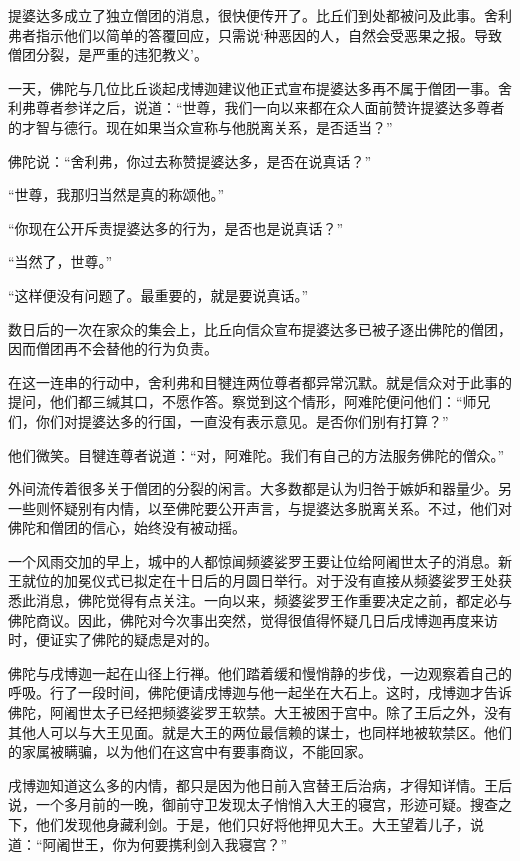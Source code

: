 \documentclass[12pt,twoside,openany]{book}
\begin{document}
提婆达多成立了独立僧团的消息，很快便传开了。比丘们到处都被问及此事。舍利弗者指示他们以简单的答覆回应，只需说‘种恶因的人，自然会受恶果之报。导致僧团分裂，是严重的违犯教义’。

一天，佛陀与几位比丘谈起戌博迦建议他正式宣布提婆达多再不属于僧团一事。舍利弗尊者参详之后，说道：“世尊，我们一向以来都在众人面前赞许提婆达多尊者的才智与德行。现在如果当众宣称与他脱离关系，是否适当？”

佛陀说：“舍利弗，你过去称赞提婆达多，是否在说真话？”

“世尊，我那归当然是真的称颂他。”

“你现在公开斥责提婆达多的行为，是否也是说真话？”

“当然了，世尊。”

“这样便没有问题了。最重要的，就是要说真话。”

数日后的一次在家众的集会上，比丘向信众宣布提婆达多已被子逐出佛陀的僧团，因而僧团再不会替他的行为负责。

在这一连串的行动中，舍利弗和目犍连两位尊者都异常沉默。就是信众对于此事的提问，他们都三缄其口，不愿作答。察觉到这个情形，阿难陀便问他们：“师兄们，你们对提婆达多的行国，一直没有表示意见。是否你们别有打算？”

他们微笑。目犍连尊者说道：“对，阿难陀。我们有自己的方法服务佛陀的僧众。”

外间流传着很多关于僧团的分裂的闲言。大多数都是认为归咎于嫉妒和器量少。另一些则怀疑别有内情，以至佛陀要公开声言，与提婆达多脱离关系。不过，他们对佛陀和僧团的信心，始终没有被动摇。

一个风雨交加的早上，城中的人都惊闻频婆娑罗王要让位给阿阇世太子的消息。新王就位的加冕仪式已拟定在十日后的月圆日举行。对于没有直接从频婆娑罗王处获悉此消息，佛陀觉得有点关注。一向以来，频婆娑罗王作重要决定之前，都定必与佛陀商议。因此，佛陀对今次事出突然，觉得很值得怀疑几日后戌博迦再度来访时，便证实了佛陀的疑虑是对的。

佛陀与戌博迦一起在山径上行禅。他们踏着缓和慢悄静的步伐，一边观察着自己的呼吸。行了一段时间，佛陀便请戌博迦与他一起坐在大石上。这时，戌博迦才告诉佛陀，阿阇世太子已经把频婆娑罗王软禁。大王被困于宫中。除了王后之外，没有其他人可以与大王见面。就是大王的两位最信赖的谋士，也同样地被软禁区。他们的家属被瞒骗，以为他们在这宫中有要事商议，不能回家。

戌博迦知道这么多的内情，都只是因为他日前入宫替王后治病，才得知详情。王后说，一个多月前的一晚，御前守卫发现太子悄悄入大王的寝宫，形迹可疑。搜查之下，他们发现他身藏利剑。于是，他们只好将他押见大王。大王望着儿子，说道：“阿阇世王，你为何要携利剑入我寝宫？”
\end{document}
